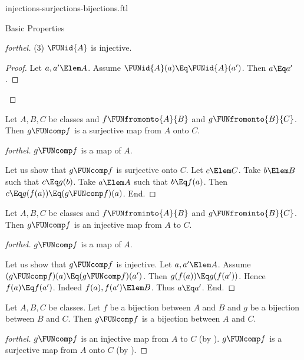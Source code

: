 \documentclass{stex}
\begin{document}
\begin{smodule}{injections-surjections-bijections.ftl}
\begin{sfragment}{Basic Properties}
\begin{proof}[forthel]
    (3) $\FUNid{A}$ is injective.
    \begin{proof}
      Let $a, a' \Elem A$.
      Assume $\FUNid{A}(a) \Eq \FUNid{A}(a')$.
      Then $a \Eq a'$.
    \end{proof}
  \end{proof}

  \begin{proposition}[forthel,id=FOUNDATIONS_08_8542698338254848]
    Let $A, B, C$ be classes and $f \FUNfromonto{A}{B}$ and $g \FUNfromonto{B}{C}$.
    Then $g \FUNcomp f$ is a surjective map from $A$ onto $C$.
  \end{proposition}
  \begin{proof}[forthel]
    $g \FUNcomp f$ is a map of $A$.

    Let us show that $g \FUNcomp f$ is surjective onto $C$.
      Let $c \Elem C$.
      Take $b \Elem B$ such that $c \Eq g(b)$.
      Take $a \Elem A$ such that $b \Eq f(a)$.
      Then $c \Eq g(f(a)) \Eq (g \FUNcomp f)(a)$.
    End.
  \end{proof}

  \begin{proposition}[forthel,id=FOUNDATIONS_08_3367836856614912]
    Let $A, B, C$ be classes and $f \FUNfrominto{A}{B}$ and $g \FUNfrominto{B}{C}$.
    Then $g \FUNcomp f$ is an injective map from $A$ to $C$.
  \end{proposition}
  \begin{proof}[forthel]
    $g \FUNcomp f$ is a map of $A$.

    Let us show that $g \FUNcomp f$ is injective.
      Let $a, a' \Elem A$.
      Assume $(g \FUNcomp f)(a) \Eq (g \FUNcomp f)(a')$.
      Then $g(f(a)) \Eq g(f(a'))$.
      Hence $f(a) \Eq f(a')$.
      Indeed $f(a), f(a') \Elem B$.
      Thus $a \Eq a'$.
    End.
  \end{proof}

  \begin{corollary}[forthel,id=FOUNDATIONS_08_6435206693126144]
    Let $A, B, C$ be classes.
    Let $f$ be a bijection between $A$ and $B$ and $g$ be a bijection between $B$ and $C$.
    Then $g \FUNcomp f$ is a bijection between $A$ and $C$.
  \end{corollary}
  \begin{proof}[forthel]
    $g \FUNcomp f$ is an injective map from $A$ to $C$ (by ).
    $g \FUNcomp f$ is a surjective map from $A$ onto $C$ (by ).
  \end{proof}


\end{sfragment}
\end{smodule}
\end{document}
